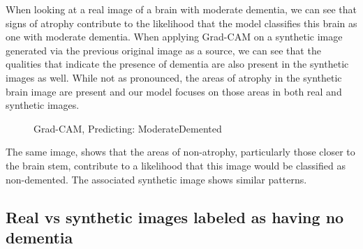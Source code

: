 \documentclass [MS] {uclathes}
\begin{document}
When looking at a real image of a brain with moderate dementia, we can see that signs of atrophy contribute to the 
likelihood that the model classifies this brain as one with moderate dementia. When applying Grad-CAM on a synthetic 
image generated via the previous original image as a source, we can see that the qualities that indicate the presence of 
dementia are also present in the synthetic images as well. While not as pronounced, the areas of atrophy in the 
synthetic brain image are present and our model focuses on those areas in both real and synthetic images.

\begin{figure}[H]
    \centering
    \hspace{0.001\textwidth}
    \caption{Grad-CAM, Predicting: ModerateDemented}
\end{figure}
The same image, shows that the areas of non-atrophy, particularly those closer to the brain stem, contribute to a 
likelihood that this image would be classified as non-demented. The associated synthetic image shows similar patterns.



\subsection{Real vs synthetic images labeled as having no dementia}
\end{document}
